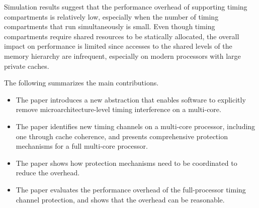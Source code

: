 

Simulation results suggest that the performance overhead of supporting
timing compartments is relatively low, especially when the number of timing
compartments that run simultaneously is small.
Even though timing compartments require shared resources to be statically
allocated, the overall impact on performance is limited since accesses to the
shared levels of the memory hierarchy are infrequent, especially on modern
processors with large private caches.

The following summarizes the main contributions.

\begin{itemize}
\item The paper introduces a new abstraction that enables software to
explicitly remove microarchitecture-level timing interference on a multi-core.
\item The paper identifies new timing channels on a multi-core processor,
including one through cache coherence, and presents
comprehensive protection mechanisms for a full multi-core processor.
\item The paper shows how protection mechanisms need to be coordinated to
reduce the overhead.%
\item The paper evaluates the performance overhead of the full-processor
timing channel protection, and shows that the overhead can be reasonable.
\end{itemize}

